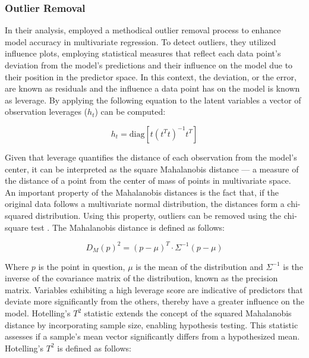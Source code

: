 \subsubsection{Outlier Removal}\label{sec:outlier_removal}

In their analysis, \citet{andersonImprovedAccuracyQuantitative2017} employed a methodical outlier removal process to enhance model accuracy in multivariate regression. To detect outliers, they utilized influence plots, employing statistical measures that reflect each data point's deviation from the model's predictions and their influence on the model due to their position in the predictor space. 
In this context, the deviation, or the error, are known as residuals and the influence a data point has on the model is known as leverage. By applying the following equation to the latent variables a vector of observation leverages (\(h_t\)) can be computed:

\begin{equation}
    h_t = \text{diag}\left[ t(t^T t)^{-1} t^T \right]
\end{equation}

Given that leverage quantifies the distance of each observation from the model's center, it can be interpreted as the square Mahalanobis distance — a measure of the distance of a point from the center of mass of points in multivariate space. 
An important property of the Mahalanobis distances is the fact that, if the original data follows a multivariate normal distribution, the distances form a chi-squared distribution. Using this property, outliers can be removed using the chi-square test \cite{brereton_chi_2015}.
The Mahalanobis distance is defined as follows:

\begin{equation}
    D_M(p)^2 = (p - \mu)^T \cdot \Sigma^{-1} (p - \mu)
\end{equation}

Where $p$ is the point in question, $\mu$ is the mean of the distribution and $\Sigma^{-1}$ is the inverse of the covariance matrix of the distribution, known as the precision matrix. 
Variables exhibiting a high leverage score are indicative of predictors that deviate more significantly from the others, thereby have a greater influence on the model.
Hotelling's \( T^2 \) statistic extends the concept of the squared Mahalanobis distance by incorporating sample size, enabling hypothesis testing. 
This statistic assesses if a sample's mean vector significantly differs from a hypothesized mean. Hotelling's \( T^2 \) is defined as follows:

